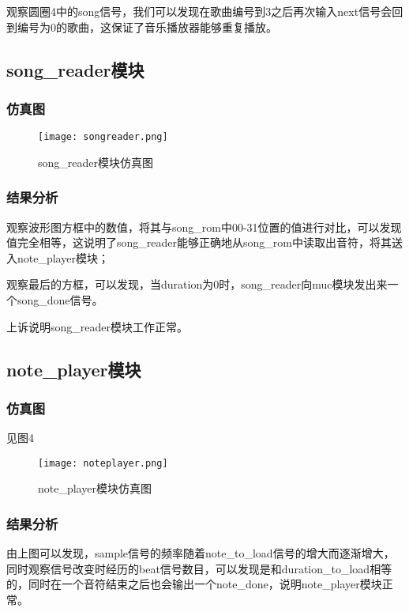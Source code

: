 \documentclass{../source/zjureport}
\begin{document}
        观察圆圈4中的song信号，我们可以发现在歌曲编号到3之后再次输入next信号会回到编号为0的歌曲，这保证了音乐播放器能够重复播放。
        

    \subsection{song_reader模块}
        \subsubsection{仿真图}
        \begin{figure}[htp]
            \centering
            \texttt{[image: songreader.png]}
            \caption{song_reader模块仿真图}
        \end{figure}

        \subsubsection{结果分析}
        观察波形图方框中的数值，将其与song_rom中00-31位置的值进行对比，可以发现值完全相等，这说明了song_reader能够正确地从song_rom中读取出音符，将其送入note_player模块；

        观察最后的方框，可以发现，当duration为0时，song_reader向muc模块发出来一个song_done信号。

        上诉说明song_reader模块工作正常。
    
    \subsection{note_player模块}
        \subsubsection{仿真图}
        见图4
        \begin{figure}[htp]
            \centering
            \texttt{[image: noteplayer.png]}
            \caption{note_player模块仿真图}
        \end{figure}

        \subsubsection{结果分析}
        由上图可以发现，sample信号的频率随着note_to_load信号的增大而逐渐增大，同时观察信号改变时经历的beat信号数目，可以发现是和duration_to_load相等的，同时在一个音符结束之后也会输出一个note_done，说明note_player模块正常。
\end{document}
